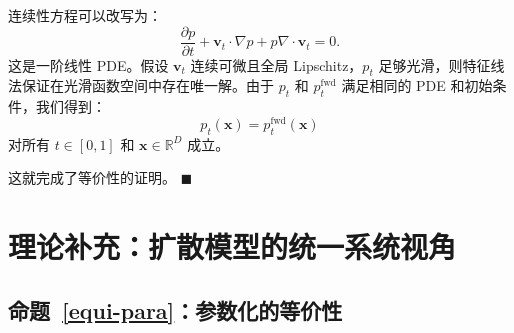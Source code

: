连续性方程可以改写为：
\[
\frac{\partial p}{\partial t} + \mathbf{v}_t \cdot \nabla p + p \nabla \cdot \mathbf{v}_t = 0.
\]
这是一阶线性 PDE。假设 $ \mathbf{v}_t $ 连续可微且全局 Lipschitz，$ p_t $ 足够光滑，则特征线法保证在光滑函数空间中存在唯一解。由于 $ p_t $ 和 $ p_t^{\mathrm{fwd}} $ 满足相同的 PDE 和初始条件，我们得到：
\[
p_t(\mathbf{x}) = p_t^{\mathrm{fwd}}(\mathbf{x})
\]
对所有 $t\in[0,1]$ 和 $\mathbf{x} \in \mathbb{R}^D$ 成立。

这就完成了等价性的证明。
\hfill$\blacksquare$

\clearpage
\newpage

\section{理论补充：扩散模型的统一系统视角}\label{app-sec:equiv-para}

\subsection{命题~\ref{equi-para}：参数化的等价性}

